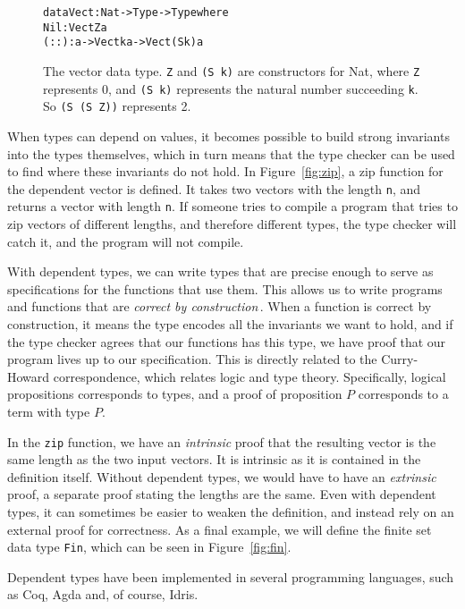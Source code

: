 \begin{figure}
\label{fig:vect}
\begin{alltt}
data Vect : Nat -> Type -> Type where
  Nil  : Vect Z a
  (::) : a -> Vect k a -> Vect (S k) a
\end{alltt}
\caption{The vector data type. \texttt{Z} and \texttt{(S k)} are constructors for Nat, where \texttt{Z} represents 0, and \texttt{(S k)} represents the natural number succeeding \texttt{k}. So \texttt{(S (S Z))} represents 2.}
\end{figure}

When types can depend on values, it becomes possible to build strong invariants into the types themselves, which in turn means that the type checker can be used to find where these invariants do not hold. In Figure~\ref{fig:zip}, a zip function for the dependent vector is defined. It takes two vectors with the length \texttt{n}, and returns a vector with length \texttt{n}. If someone tries to compile a program that tries to zip vectors of different lengths, and therefore different types, the type checker will catch it, and the program will not compile. 

With dependent types, we can write types that are precise enough to serve as specifications for the functions that use them. This allows us to write programs and functions that are \emph{correct by construction}\,\cite[p. 464]{Pierce:TypeSystems}. When a function is correct by construction, it means the type encodes all the invariants we want to hold, and if the type checker agrees that our functions has this type, we have proof that our program lives up to our specification. This is directly related to the Curry-Howard correspondence, which relates logic and type theory. Specifically, logical propositions corresponds to types, and a proof of proposition $P$ corresponds to a term with type $P$.

In the \texttt{zip} function, we have an \emph{intrinsic} proof that the resulting vector is the same length as the two input vectors. It is intrinsic as it is contained in the definition itself. Without dependent types, we would have to have an \emph{extrinsic} proof, a separate proof stating the lengths are the same. Even with dependent types, it can sometimes be easier to weaken the definition, and instead rely on an external proof for correctness. As a final example, we will define the finite set data type \texttt{Fin}, which can be seen in Figure~\ref{fig:fin}.

Dependent types have been implemented in several programming languages, such as Coq, Agda and, of course, Idris. 

